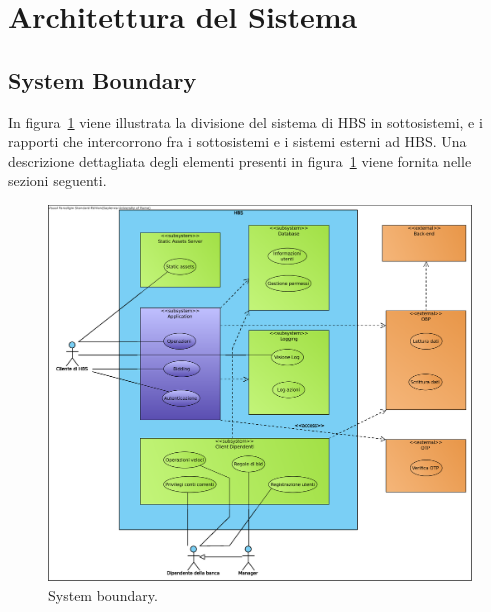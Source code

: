 
\section{Architettura del Sistema}

\subsection{System Boundary}

In figura~\ref{fig:system-boundary} viene illustrata la divisione del sistema di HBS in sottosistemi, e i rapporti che intercorrono fra i sottosistemi e i sistemi esterni ad HBS.
Una descrizione dettagliata degli elementi presenti in figura~\ref{fig:system-boundary} viene fornita nelle sezioni seguenti.

\begin{figure}[h]
	\centering
	\includegraphics[width=\textwidth]{Images/System_Boundary.eps}
	\caption{System boundary.}
	\label{fig:system-boundary}
\end{figure}


